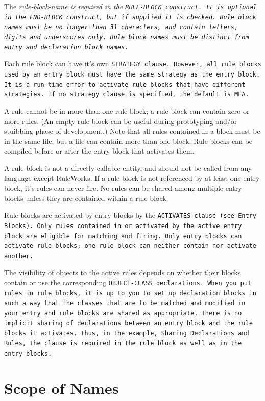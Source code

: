 The \it{rule-block-name} is required in the \tt{RULE-BLOCK}
construct. It is optional in the \tt{END-BLOCK} construct, but if
supplied it is checked. Rule block names must be no longer than 31
characters, and contain letters, digits and underscores only. Rule
block names must be distinct from entry and declaration block names.

Each rule block can have it's own \tt{STRATEGY} clause. However, all
rule blocks used by an entry block must have the same strategy as the
entry block. It is a run-time error to activate rule blocks that have
different strategies. If no strategy clause is specified, the default
is \tt{MEA}.

A rule cannot be in more than one rule block; a rule block can contain
zero or more rules.  (An empty rule block can be useful during
prototyping and/or stuibbing phase of development.) Note that all
rules contained in a block must be in the same file, but a file can
contain more than one block. Rule blocks can be compiled before or
after the entry block that activates them.

\begin{note}
  A rule block is not a directly callable entity, and should not be
  called from any language except RuleWorks. If a rule block is not
  referenced by at least one entry block, it's rules can never
  fire. No rules can be shared among multiple entry blocks unless they
  are contained within a rule block.
\end{note}

Rule blocks are activated by entry blocks by the \tt{ACTIVATES} clause
(see Entry Blocks). Only rules contained in or activated by the active
entry block are eligible for matching and firing. Only entry blocks
can activate rule blocks; one rule block can neither contain nor
activate another.

The visibility of objects to the active rules depends on whether their
blocks contain or use the corresponding \tt{OBJECT-CLASS}
declarations.  When you put rules in rule blocks, it is up to you to
set up declaration blocks in such a way that the classes that are to
be matched and modified in your entry and rule blocks are shared as
appropriate. There is no implicit sharing of declarations between an
entry block and the rule blocks it activates. Thus, in the example,
Sharing Declarations and Rules, the clause is required in the rule
block as well as in the entry blocks.

\section{Scope of Names}

